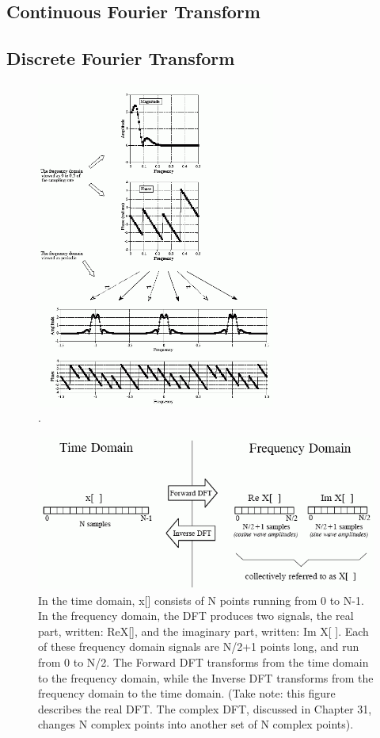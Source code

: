 \documentclass[a4paper,12pt]{article}
\begin{document}
\subsection{Continuous Fourier Transform}

\subsection{Discrete Fourier Transform}
\begin{figure}[ht]
  \label{fig:F_10_9}
  \centering
	\includegraphics[width=0.7\textwidth, keepaspectratio=true]{F_10_9}
	\caption{.}
\end{figure}


\begin{figure}[h!]
 \label{fig:F_8_3}
 \centering
 \includegraphics[width=\textwidth, keepaspectratio=true]{F_8_3}
 \caption{In the time domain, x[] consists of N points running from 0 to N-1. In the frequency domain,
the DFT produces two signals, the real part, written: ReX[], and the imaginary part, written: Im X[ ]. Each of
these frequency domain signals are N/2+1 points long, and run from 0 to N/2. The Forward DFT transforms from
the time domain to the frequency domain, while the Inverse DFT transforms from the frequency domain to the
time domain. (Take note: this figure describes the real DFT. The complex DFT, discussed in Chapter 31,
changes N complex points into another set of N complex points).}
\end{figure}
\end{document}

